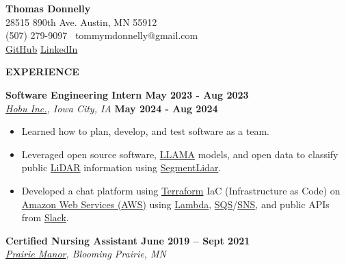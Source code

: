 \textbf{Thomas Donnelly}\\
28515 890th Ave. \textbar{} Austin, MN 55912\\
(507) 279-9097 \textbar~tommymdonnelly@gmail.com\\
\href{https://github.com/TomTheTonk}{GitHub}
\href{http://linkedin.com/in/thomas-donnelly-429405320}{LinkedIn}

\textbf{EXPERIENCE}

\textbf{Software Engineering Intern May 2023 - Aug 2023}\\
\emph{\href{https://www.linkedin.com/company/hobu-inc}{Hobu Inc.}, Iowa
City, IA} \textbf{May 2024 - Aug 2024}

\begin{itemize}
\item
  Learned how to plan, develop, and test software as a team.
\item
  Leveraged open source software, \href{https://www.llama.com/}{LLAMA}
  models, and open data to classify public
  \href{https://www.neonscience.org/resources/learning-hub/tutorials/lidar-basics}{LiDAR}
  information using
  \href{https://github.com/Yarroudh/segment-lidar}{SegmentLidar}.
\item
  Developed a chat platform using
  \href{https://developer.hashicorp.com/terraform/language}{Terraform}
  IaC (Infrastructure as Code) on
  \href{https://aws.amazon.com/free/?gclid=CjwKCAiAiOa9BhBqEiwABCdG8xJm7dpo0Ifa4i8UYcSexU289wg1I5QgB0YQaTpD3Cc5l3oCR2H94hoCvTYQAvD_BwE\&trk=6a4c3e9d-cdc9-4e25-8dd9-2bd8d15afbca\&sc_channel=ps\&ef_id=CjwKCAiAiOa9BhBqEiwABCdG8xJm7dpo0Ifa4i8UYcSexU289wg1I5QgB0YQaTpD3Cc5l3oCR2H94hoCvTYQAvD_BwE:G:s\&s_kwcid=AL!4422!3!651751059777!e!!g!!amazon\%20web\%20services!19852662197!145019195737\&all-free-tier.sort-by=item.additionalFields.SortRank\&all-free-tier.sort-order=asc\&awsf.Free\%20Tier\%20Types=*all\&awsf.Free\%20Tier\%20Categories=*all}{Amazon
  Web Services (AWS)} using
  \href{https://aws.amazon.com/pm/lambda/?gclid=CjwKCAiAiOa9BhBqEiwABCdG8_-jcsK9i3KVP2t5NgupDXinpyF36M-7OgfzGPhJI0F8zaahD0sMmBoC8NIQAvD_BwE\&trk=e0e0d4be-47fe-4336-ab69-7eece7f3d36e\&sc_channel=ps\&ef_id=CjwKCAiAiOa9BhBqEiwABCdG8_-jcsK9i3KVP2t5NgupDXinpyF36M-7OgfzGPhJI0F8zaahD0sMmBoC8NIQAvD_BwE:G:s\&s_kwcid=AL!4422!3!652240143523!e!!g!!amazon\%20lambda!19878797032!147151597893}{Lambda},
  \href{https://aws.amazon.com/sqs/}{SQS}/\href{https://aws.amazon.com/sns/}{SNS},
  and public APIs from \href{https://api.slack.com/}{Slack}.
\end{itemize}

\textbf{Certified Nursing Assistant June 2019 -- Sept 2021}\\
\emph{\href{https://prairiemanorcare.com/}{Prairie Manor}, Blooming
Prairie, MN}

